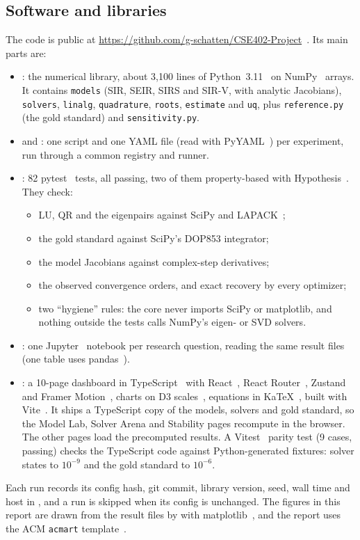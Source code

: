 \documentclass[sigconf]{acmart}
\newcommand{\repo}{\url{https://github.com/g-schatten/CSE402-Project}}
\begin{document}
\subsection{Software and libraries}
The code is public at \repo~\cite{sirlab_repo}. Its main parts are:
\begin{itemize}
  \item {}: the numerical library, about 3{,}100
    lines of Python~3.11~\cite{python} on NumPy~\cite{harris2020numpy}
    arrays. It contains \texttt{models} (SIR, SEIR, SIRS and SIR-V, with
    analytic Jacobians), \texttt{solvers}, \texttt{linalg},
    \texttt{quadrature}, \texttt{roots}, \texttt{estimate} and
    \texttt{uq}, plus \texttt{reference.py} (the gold standard) and
    \texttt{sensitivity.py}.
  \item {} and : one script and one
    YAML file (read with PyYAML~\cite{pyyaml}) per experiment, run
    through a common registry and runner.
  \item {}: 82 pytest~\cite{pytest} tests, all passing, two of
    them property-based with Hypothesis~\cite{hypothesis}. They check:
    \begin{itemize}
      \item LU, QR and the eigenpairs against SciPy and
        LAPACK~\cite{scipy};
      \item the gold standard against SciPy's DOP853 integrator;
      \item the model Jacobians against complex-step derivatives;
      \item the observed convergence orders, and exact recovery by every
        optimizer;
      \item two ``hygiene'' rules: the core never imports SciPy or
        matplotlib, and nothing outside the tests calls NumPy's eigen-
        or SVD solvers.
    \end{itemize}
  \item {}: one Jupyter~\cite{jupyter} notebook per
    research question, reading the same result files (one table uses
    pandas~\cite{pandas}).
  \item {}: a 10-page dashboard in TypeScript~\cite{typescript}
    with React~\cite{react}, React Router~\cite{reactrouter},
    Zustand~\cite{zustand} and Framer Motion~\cite{framermotion}, charts
    on D3 scales~\cite{bostock2011}, equations in KaTeX~\cite{katex},
    built with Vite~\cite{vite}. It ships a TypeScript copy of the
    models, solvers and gold standard, so the Model Lab, Solver Arena
    and Stability pages recompute in the browser. The other pages load
    the precomputed results. A Vitest~\cite{vitest} parity test (9 cases,
    passing) checks the TypeScript code against Python-generated
    fixtures: solver states to $10^{-9}$ and the gold standard to
    $10^{-6}$.
\end{itemize}
Each run records its config hash, git commit, library version, seed,
wall time and host in , and a run is skipped
when its config is unchanged. The figures in this report are drawn from
the result files by  with
matplotlib~\cite{hunter2007}, and the report uses the ACM \texttt{acmart}
template~\cite{acmart}.
\end{document}
